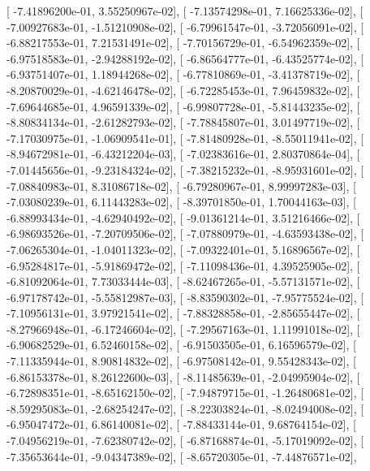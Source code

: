 \documentclass{article}
\begin{document}
       [ -7.41896200e-01,   3.55250967e-02],
       [ -7.13574298e-01,   7.16625336e-02],
       [ -7.00927683e-01,  -1.51210908e-02],
       [ -6.79961547e-01,  -3.72056091e-02],
       [ -6.88217553e-01,   7.21531491e-02],
       [ -7.70156729e-01,  -6.54962359e-02],
       [ -6.97518583e-01,  -2.94288192e-02],
       [ -6.86564777e-01,  -6.43525774e-02],
       [ -6.93751407e-01,   1.18944268e-02],
       [ -6.77810869e-01,  -3.41378719e-02],
       [ -8.20870029e-01,  -4.62146478e-02],
       [ -6.72285453e-01,   7.96459832e-02],
       [ -7.69644685e-01,   4.96591339e-02],
       [ -6.99807728e-01,  -5.81443235e-02],
       [ -8.80834134e-01,  -2.61282793e-02],
       [ -7.78845807e-01,   3.01497719e-02],
       [ -7.17030975e-01,  -1.06909541e-01],
       [ -7.81480928e-01,  -8.55011941e-02],
       [ -8.94672981e-01,  -6.43212204e-03],
       [ -7.02383616e-01,   2.80370864e-04],
       [ -7.01445656e-01,  -9.23184324e-02],
       [ -7.38215232e-01,  -8.95931601e-02],
       [ -7.08840983e-01,   8.31086718e-02],
       [ -6.79280967e-01,   8.99997283e-03],
       [ -7.03080239e-01,   6.11443283e-02],
       [ -8.39701850e-01,   1.70044163e-03],
       [ -6.88993434e-01,  -4.62940492e-02],
       [ -9.01361214e-01,   3.51216466e-02],
       [ -6.98693526e-01,  -7.20709506e-02],
       [ -7.07880979e-01,  -4.63593438e-02],
       [ -7.06265304e-01,  -1.04011323e-02],
       [ -7.09322401e-01,   5.16896567e-02],
       [ -6.95284817e-01,  -5.91869472e-02],
       [ -7.11098436e-01,   4.39525905e-02],
       [ -6.81092064e-01,   7.73033444e-03],
       [ -8.62467265e-01,  -5.57131571e-02],
       [ -6.97178742e-01,  -5.55812987e-03],
       [ -8.83590302e-01,  -7.95775524e-02],
       [ -7.10956131e-01,   3.97921541e-02],
       [ -7.88328858e-01,  -2.85655447e-02],
       [ -8.27966948e-01,  -6.17246604e-02],
       [ -7.29567163e-01,   1.11991018e-02],
       [ -6.90682529e-01,   6.52460158e-02],
       [ -6.91503505e-01,   6.16596579e-02],
       [ -7.11335944e-01,   8.90814832e-02],
       [ -6.97508142e-01,   9.55428343e-02],
       [ -6.86153378e-01,   8.26122600e-03],
       [ -8.11485639e-01,  -2.04995904e-02],
       [ -6.72898351e-01,  -8.65162150e-02],
       [ -7.94879715e-01,  -1.26480681e-02],
       [ -8.59295083e-01,  -2.68254247e-02],
       [ -8.22303824e-01,  -8.02494008e-02],
       [ -6.95047472e-01,   6.86140081e-02],
       [ -7.88433144e-01,   9.68764154e-02],
       [ -7.04956219e-01,  -7.62380742e-02],
       [ -6.87168874e-01,  -5.17019092e-02],
       [ -7.35653644e-01,  -9.04347389e-02],
       [ -8.65720305e-01,  -7.44876571e-02],
\end{document}

